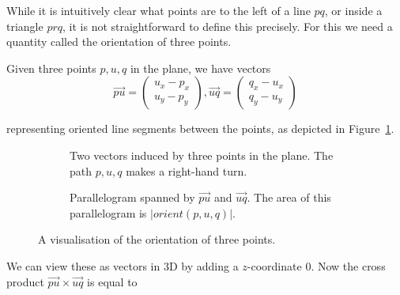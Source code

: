 While it is intuitively clear what points are to the left of a line $pq$, or
inside a triangle $prq$, it is not straightforward to define this precisely.
For this we need a quantity called the orientation of three points.

Given three points $p, u, q$ in the plane, we have vectors
\[
    \vec{pu} = \begin{pmatrix}
        u_x - p_x \\
        u_y - p_y
    \end{pmatrix},
    \vec{uq} = \begin{pmatrix}
        q_x - u_x \\
        q_y - u_y
    \end{pmatrix}
\]

representing oriented line segments between the points, as depicted in
Figure~\ref{fig:orient1}.

\begin{figure}[ht]
    \begin{subfigure}{0.45\textwidth}
    \caption{Two vectors induced by three points in the plane. The path 
             $p, u, q$ makes a right-hand turn.}
    \label{fig:orient1}
    \end{subfigure}\hfill
    \begin{subfigure}{0.45\textwidth}
    \caption{Parallelogram spanned by $\vec{pu}$ and $\vec{uq}$. 
             The area of this parallelogram is $|orient(p, u, q)|$.}
    \label{fig:orient2}
    \end{subfigure}
    \caption{A visualisation of the orientation of three points.}
\end{figure}

We can view these as vectors in 3D by adding a $z$-coordinate $0$. Now the
cross product $\vec{pu} \times \vec{uq}$ is equal to 

